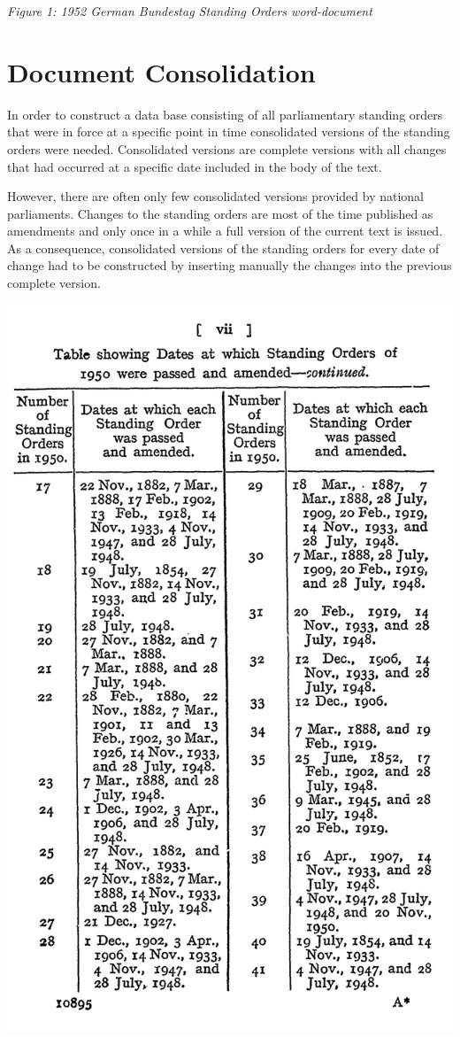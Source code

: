 \documentclass[10pt,]{article}
\begin{document}
\emph{Figure 1: 1952 German Bundestag Standing Orders word-document}

\newpage

\section{Document Consolidation}\label{document-consolidation}

In order to construct a data base consisting of all parliamentary
standing orders that were in force at a specific point in time
consolidated versions of the standing orders were needed. Consolidated
versions are complete versions with all changes that had occurred at a
specific date included in the body of the text.

However, there are often only few consolidated versions provided by
national parliaments. Changes to the standing orders are most of the
time published as amendments and only once in a while a full version of
the current text is issued. As a consequence, consolidated versions of
the standing orders for every date of change had to be constructed by
inserting manually the changes into the previous complete version.

\begin{center}
\includegraphics[height=0.7\textheight]{fig/fig1a.png}
\end{center}
\end{document}
